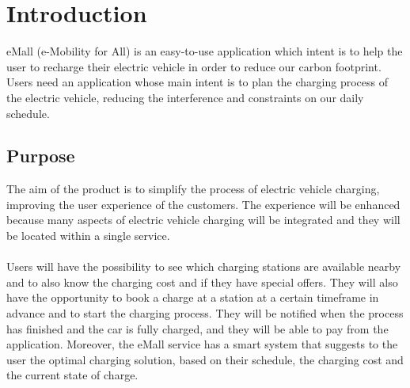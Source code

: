 \section{Introduction}
eMall (e-Mobility for All) is an easy-to-use application which intent is to help the user to recharge their electric vehicle in order to reduce our carbon footprint.
Users need an application whose main intent is to plan the charging process of the electric vehicle, reducing the interference and constraints on our daily schedule.

\subsection{Purpose}

The aim of the product is to simplify the process of electric vehicle charging, improving the user experience of the customers.
The experience will be enhanced because many aspects of electric vehicle charging will be integrated and they will be located within a single service.
\\\\
Users will have the possibility to see which charging stations are available nearby and to also know the charging cost and if they have special offers.
They will also have the opportunity to book a charge at a station at a certain timeframe in advance and to start the charging process.
They will be notified when the process has finished and the car is fully charged, and they will be able to pay from the application.
Moreover, the eMall service has a smart system that suggests to the user the optimal charging solution, based on their schedule, the charging cost and the current state of charge.
